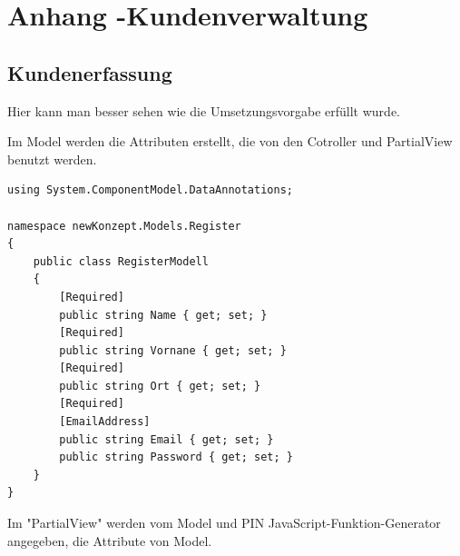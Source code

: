 \chapter{Anhang -Kundenverwaltung}

\section{Kundenerfassung}
Hier kann man besser sehen wie die Umsetzungsvorgabe erfüllt wurde.

Im Model werden die Attributen erstellt, die von den Cotroller und PartialView benutzt werden.

\begin{lstlisting}[caption={RegisterModel}, label=lst:registerModel]
using System.ComponentModel.DataAnnotations;

namespace newKonzept.Models.Register
{
	public class RegisterModell
	{
		[Required]
		public string Name { get; set; }
		[Required]
		public string Vornane { get; set; }
		[Required]
		public string Ort { get; set; }
		[Required]
		[EmailAddress]
		public string Email { get; set; }
		public string Password { get; set; }
	}
}
\end{lstlisting}

 Im "PartialView" werden vom Model und PIN JavaScript-Funktion-Generator angegeben, die Attribute von Model. 

